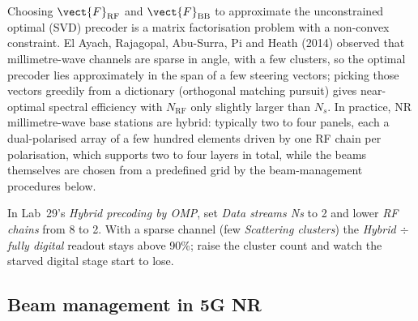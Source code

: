 Choosing $\vect{F}_{\text{RF}}$ and $\vect{F}_{\text{BB}}$ to approximate the unconstrained optimal
(SVD) precoder is a matrix factorisation problem with a non-convex constraint. El Ayach, Rajagopal,
Abu-Surra, Pi and Heath (2014) observed that millimetre-wave channels are sparse in angle, with a few
clusters, so the optimal precoder lies approximately in the span of a few steering vectors; picking
those vectors greedily from a dictionary (orthogonal matching pursuit) gives near-optimal spectral
efficiency with $N_{\text{RF}}$ only slightly larger than $N_s$. In practice, NR millimetre-wave base
stations are hybrid: typically two to four panels, each a dual-polarised array of a few hundred
elements driven by one RF chain per polarisation, which supports two to four layers in total, while
the beams themselves are chosen from a predefined grid by the beam-management procedures below.

\begin{tryit}
In Lab~29's \emph{Hybrid precoding by OMP}, set \emph{Data streams Ns} to 2 and lower \emph{RF
chains} from 8 to 2. With a sparse channel (few \emph{Scattering clusters}) the \emph{Hybrid $\div$
fully digital} readout stays above 90\%; raise the cluster count and watch the starved digital stage
start to lose.
\end{tryit}

\subsection{Beam management in 5G NR}


